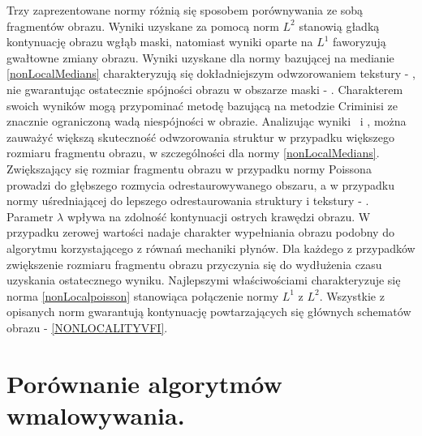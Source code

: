 \documentclass[12pt, twoside, openany]{report}
\theoremstyle{definition}
\begin{document}
Trzy zaprezentowane normy różnią się sposobem porównywania ze sobą fragmentów obrazu. Wyniki uzyskane za pomocą norm $L^2$ stanowią gładką kontynuację obrazu wgłąb maski, natomiast wyniki oparte na $L^1$ faworyzują gwałtowne zmiany obrazu. Wyniki uzyskane dla normy bazującej na medianie \eqref{nonLocalMedians} charakteryzują się dokładniejszym odwzorowaniem tekstury - \kotmyszm,  nie gwarantując ostatecznie spójności obrazu w obszarze maski - \ObrIVm. Charakterem swoich wyników mogą przypominać metodę bazującą na metodzie Criminisi ze znacznie ograniczoną wadą niespójności w obrazie. Analizując wyniki \maciekIm \ i \ObrXVIIm, można zauważyć większą skuteczność odwzorowania struktur w przypadku większego rozmiaru fragmentu obrazu, w szczególności dla normy \eqref{nonLocalMedians}. Zwiększający się  rozmiar fragmentu obrazu w przypadku normy Poissona prowadzi do głębszego rozmycia odrestaurowywanego obszaru, a w przypadku normy uśredniającej do lepszego odrestaurowania struktury i tekstury - \ObrIVm. Parametr $\lambda$ wpływa na zdolność kontynuacji ostrych krawędzi obrazu. W przypadku zerowej wartości nadaje charakter wypełniania obrazu podobny do algorytmu korzystającego z równań mechaniki płynów. Dla każdego z przypadków zwiększenie rozmiaru fragmentu obrazu przyczynia się do wydłużenia czasu uzyskania ostatecznego wyniku. Najlepszymi właściwościami charakteryzuje się norma \eqref{nonLocalpoisson} stanowiąca połączenie normy $L^1$ z $L^2$. Wszystkie z opisanych norm gwarantują kontynuację powtarzających się głównych schematów obrazu - \autoref{NONLOCALITYVFI}.
\section{Porównanie algorytmów wmalowywania.}
\end{document}
